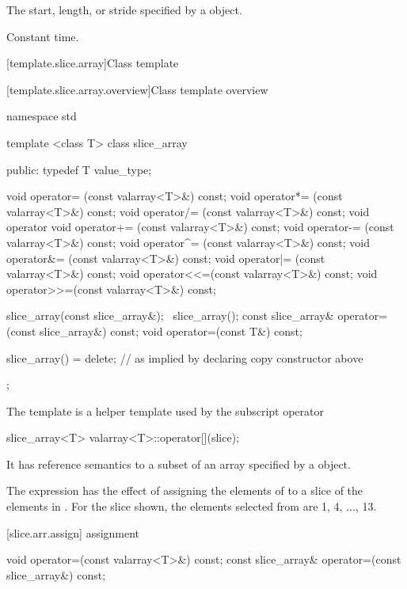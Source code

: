 \begin{itemdescr}
\pnum
\returns The start, length, or stride specified
by a  object.

\pnum
\complexity Constant time.
\end{itemdescr}

[template.slice.array]{Class template }

[template.slice.array.overview]{Class template  overview}

%
\begin{codeblock}
namespace std {
  template <class T> class slice_array {
  public:
    typedef T value_type;

    void operator=  (const valarray<T>&) const;
    void operator*= (const valarray<T>&) const;
    void operator/= (const valarray<T>&) const;
    void operator%
    void operator+= (const valarray<T>&) const;
    void operator-= (const valarray<T>&) const;
    void operator^= (const valarray<T>&) const;
    void operator&= (const valarray<T>&) const;
    void operator|= (const valarray<T>&) const;
    void operator<<=(const valarray<T>&) const;
    void operator>>=(const valarray<T>&) const;

    slice_array(const slice_array&);
    ~slice_array();
    const slice_array& operator=(const slice_array&) const;
  void operator=(const T&) const;

    slice_array() = delete;       // as implied by declaring copy constructor above
  };
}
\end{codeblock}

\pnum
The
template is a helper template used by the
subscript operator

\begin{codeblock}
slice_array<T> valarray<T>::operator[](slice);
\end{codeblock}

It has reference semantics to a subset of an array specified by a
object.

\pnum
\enterexample
The expression
has the effect of assigning the elements of
to a slice of the elements in
.
For the slice shown, the elements
selected from
are 1, 4, ..., 13.
\exitexample

[slice.arr.assign]{ assignment}

%
\begin{itemdecl}
void operator=(const valarray<T>&) const;
const slice_array& operator=(const slice_array&) const;
\end{itemdecl}

